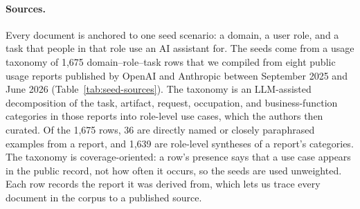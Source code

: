 \documentclass{article} %
\begin{document}
\paragraph{Sources.}
Every document is anchored to one seed scenario: a domain, a user role, and a task that people in that role use an AI assistant for. The seeds come from a usage taxonomy of 1,675 domain--role--task rows that we compiled from eight public usage reports published by OpenAI and Anthropic between September 2025 and June 2026 (Table~\ref{tab:seed-sources}). The taxonomy is an LLM-assisted decomposition of the task, artifact, request, occupation, and business-function categories in those reports into role-level use cases, which the authors then curated. Of the 1,675 rows, 36 are directly named or closely paraphrased examples from a report, and 1,639 are role-level syntheses of a report's categories. The taxonomy is coverage-oriented: a row's presence says that a use case appears in the public record, not how often it occurs, so the seeds are used unweighted. Each row records the report it was derived from, which lets us trace every document in the corpus to a published source.
\end{document}
